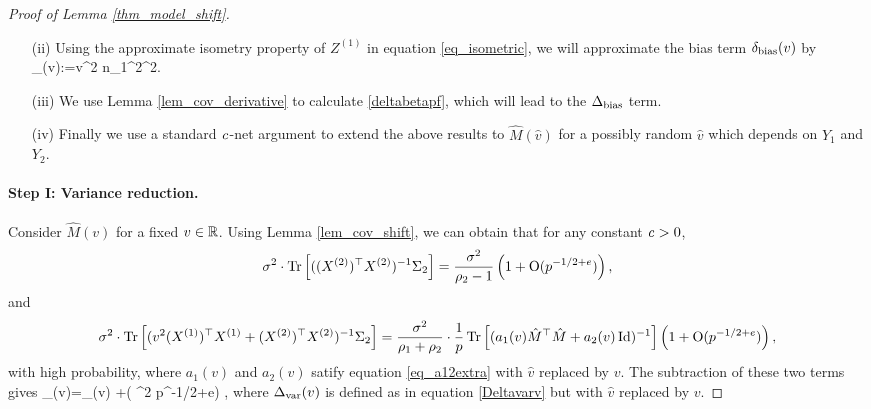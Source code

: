 \begin{proof}[Proof of Lemma \ref{thm_model_shift}]
\begin{itemize}
\item[(ii)] Using the approximate isometry property of $Z^{(1)}$ in equation \eqref{eq_isometric}, we will approximate the bias term $ \delta_{\text{bias}}(v)$ by
\be\label{deltabetapf}
\wt\delta_{\bias}(v):={v}^2 n_1^2^2.\ee

\item[(iii)] We use Lemma \ref{lem_cov_derivative} to calculate \eqref{deltabetapf}, which will lead to the $\Delta_{\text{bias}}$ term.

\item[(iv)] Finally we use a standard ${\mathit{c}}$-net argument to extend the above results to $\hat M(\hat v)$ for a possibly random $\hat v$ which depends on $Y_1$ and $Y_2$.
\end{itemize}


\paragraph{Step I: Variance reduction.} Consider $\hat M(v)$ for a fixed $v\in \mathbb{R}$. Using Lemma \ref{lem_cov_shift}, we can obtain that for any constant ${\mathit{c}}>0$,
$$  \sigma^2 \cdot \operatorname{Tr}\left[((X^{(2)})^{\top}X^{(2)})^{-1}\Sigma_2\right] = \frac{\sigma^2}{\rho_2-1}\left( 1+ \operatorname{O}(p^{-1/2+e})\right),$$
and
$$ \sigma^2 \cdot \operatorname{Tr}\left[( {v}^2 (X^{(1)})^{\top}X^{(1)} + (X^{(2)})^{\top}X^{(2)})^{-1} \Sigma_2\right] =   \frac {\sigma^2} {\rho_1 + \rho_2}\cdot \frac1p \operatorname{Tr}\left[( a_1(v) \hat M^{\top}\hat M + a_2(v)\operatorname{Id})^{-1}\right]\left( 1+ \operatorname{O}(p^{-1/2+e})\right) ,$$
with high probability, where $a_1(v)$ and $a_2(v)$ satify equation \eqref{eq_a12extra} with $\hat v$ replaced by $v$. The subtraction of these two terms gives
\be\label{deltavaral-} \delta_{\vari}(v)=\Delta_{\vari}(v) +\OO( \sigma^2 p^{-1/2+e}) \quad {},
\ee
where $\Delta_{\text{var}}(v)$ is defined as in equation \eqref{Deltavarv} but with $\hat v$ replaced by $v$.




\end{proof}
